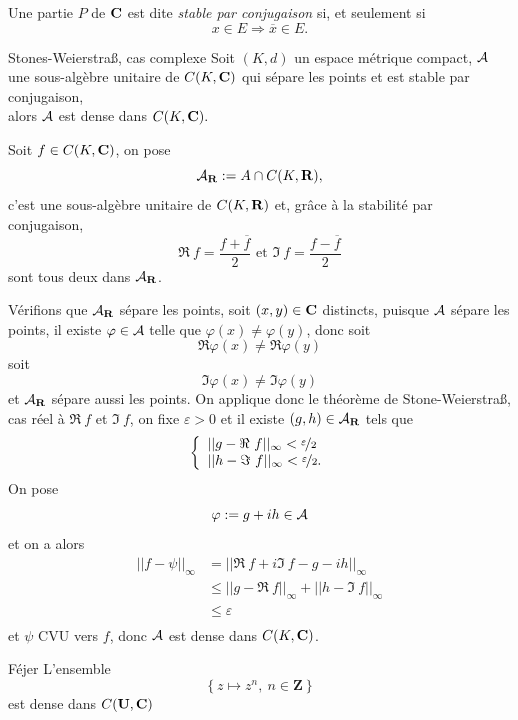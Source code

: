 \documentclass[a4paper,11pt, twoside]{article}
\begin{document}
\begin{Def}
  Une partie $P$ de $\mathbf C$ est dite \emph{stable par conjugaison} si, et seulement si
  $$ x\in E\Rightarrow \overline x\in E.$$
\end{Def}

\begin{thC}{Stones-Weierstra\ss, cas complexe}
  Soit $(K,d)$ un espace métrique compact, $\mathcal A$ une sous-algèbre unitaire de $C(K,\mathbf C)$ qui sépare les points et est stable par conjugaison,\\

  alors $\mathcal A$ est dense dans $C(K,\mathbf C).$
\end{thC}

\begin{Proof}
  Soit $f\in C(K,\mathbf C)$, on pose 
  $$\mathcal A_{\mathbf R}:=A\cap C(K,\mathbf R),$$
  c'est une sous-algèbre unitaire de $C(K,\mathbf R)$ et, grâce à la stabilité par conjugaison, 
  $$\Re\ f=\frac{f+\overline f}2\text{ et }\Im\ f=\frac{f-\overline f}2$$
  sont tous deux dans $\mathcal A_{\mathbf R}$.

  Vérifions que $\mathcal A_{\mathbf R}$ sépare les points, soit $(x,y)\in \mathbf C$ distincts, puisque $\mathcal A$ sépare les points, il existe $\varphi\in \mathcal A$ telle que $\varphi(x)\neq \varphi(y)$, donc soit
  $$\Re \varphi(x)\neq \Re \varphi(y)$$
  soit 
  $$\Im \varphi(x)\neq \Im \varphi(y)$$
  et $\mathcal A_{\mathbf R}$ sépare aussi les points.
  On applique donc le théorème de Stone-Weierstra\ss, cas réel à $\Re\ f$ et $\Im\ f$, on fixe $\varepsilon>0$ et il existe $(g,h)\in \mathcal A_{\mathbf R}$ tels que 
  $$\left\{\begin{array}{l}
    ||g-\Re\ f||_{\infty}<\nicefrac{\varepsilon}{2}\\
    ||h-\Im\ f||_{\infty}<\nicefrac{\varepsilon}{2}.
  \end{array}\right.$$
  On pose $$\varphi:=g+ih\in \mathcal A$$
  et on a alors
  \begin{align*}
    ||f-\psi||_{\infty}&=||\Re\ f+i\Im\ f-g-ih||_{\infty}\\
    &\leqslant ||g-\Re\ f||_{\infty}+||h-\Im\ f||_{\infty}\\
    &\leqslant \varepsilon\\
  \end{align*}
  et $\psi$ CVU vers $f$, donc $\mathcal A$ est dense dans $C(K,\mathbf C)$.
\end{Proof}


\begin{corollaireC}{Féjer}
  L'ensemble
  $$\left\{z\longmapsto z ^n,\ n\in\mathbf Z\right\}$$
  est dense dans $C(\mathbf U,\mathbf C)$
\end{corollaireC}
\end{document}
